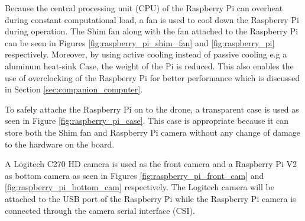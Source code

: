 \documentclass[../Head/report.tex]{subfiles}
\begin{document}
Because the central processing unit (CPU) of the Raspberry Pi can overheat during constant computational load, a fan is used to cool down the Raspberry Pi during operation. The Shim fan along with the fan attached to the Raspberry Pi can be seen in Figures \ref{fig:raspberry_pi_shim_fan} and \ref{fig:raspberry_pi} respectively. Moreover, by using active cooling instead of passive cooling e.g a aluminum heat-sink Case, the weight of the Pi is reduced. This also enables the use of overclocking of the Raspberry Pi for better performance which is discussed in Section \ref{sec:companion_computer}.

To safely attache the Raspberry Pi on to the drone, a transparent case is used as seen in Figure \ref{fig:raspberry_pi_case}. This case is appropriate because it can store both the Shim fan and Raspberry Pi camera without any change of damage to the hardware on the board. 

A Logitech C270 HD camera is used as the front camera and a Raspberry Pi V2 as bottom camera as seen in Figures \ref{fig:raspberry_pi_front_cam} and \ref{fig:raspberry_pi_bottom_cam} respectively. The Logitech camera will be attached to the USB port of the Raspberry Pi while the Raspberry Pi camera is connected through the camera serial interface (CSI). 
\end{document}
